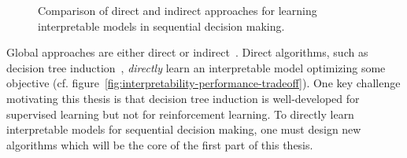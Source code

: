 \begin{figure}
    \caption{Comparison of direct and indirect approaches for learning interpretable models in sequential decision making.}
    \label{fig:direct-vs-indirect-methods}
\end{figure}

Global approaches are either direct or indirect~\cite{milani-survey}. 
Direct algorithms, such as decision tree induction~\cite{breiman1984classification}, \textit{directly} learn an interpretable model optimizing some objective (cf. figure~\ref{fig:interpretability-performance-tradeoff}).
One key challenge motivating this thesis is that decision tree induction is well-developed for supervised learning but not for reinforcement learning.
To directly learn interpretable models for sequential decision making, one must design new algorithms which will be the core of the first part of this thesis. 

